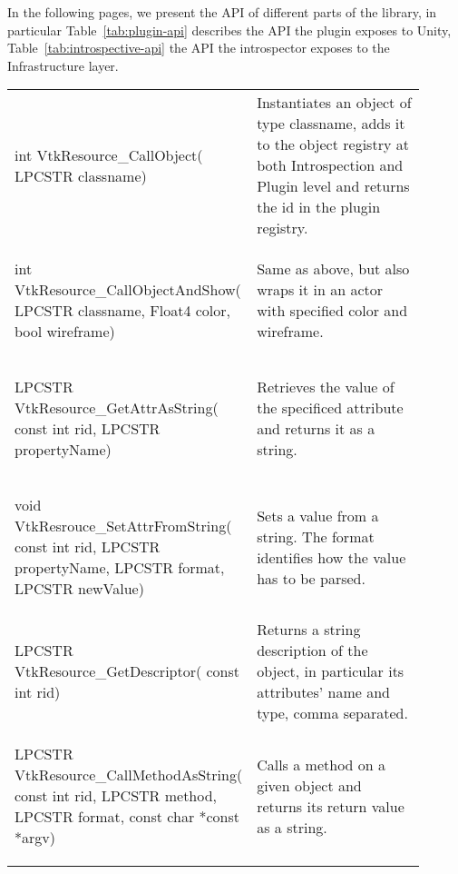 \begin{appendices}
In the following pages, we present the API of different parts of the library, in particular Table~\ref{tab:plugin-api} describes the API the plugin exposes to Unity, Table~\ref{tab:introspective-api} the API the introspector exposes to the Infrastructure layer.

\begin{landscape}
	\begin{longtable}[c]{
			>{\raggedright\arraybackslash}p{0.4\linewidth}
			>{\raggedright\arraybackslash}p{0.5\linewidth}
		}
		\multicolumn{1}{c}{\textbf{Function signature}} &
		\multicolumn{1}{c}{\textbf{Explenation}} 
		\\ \hline
	\endhead
	\begin{codify}
	int VtkResource_CallObject(
		LPCSTR classname)
	\end{codify} &
	Instantiates an object of type classname, adds it to the object registry at both Introspection and Plugin level and returns the id in the plugin registry.
	\\
	\begin{codify}
	int VtkResource_CallObjectAndShow(
		LPCSTR classname,
		Float4 color,
		bool wireframe)
	\end{codify} &
	Same as above, but also wraps it in an actor with specified color and wireframe.
	\\
	\begin{codify}
	LPCSTR VtkResource_GetAttrAsString(
		const int rid,
		LPCSTR propertyName)
	\end{codify} &
	Retrieves the value of the specificed attribute and returns it as a string.
	\\
	\begin{codify}
	void VtkResrouce_SetAttrFromString(
		const int rid,
		LPCSTR propertyName,
		LPCSTR format,
		LPCSTR newValue)
	\end{codify} &
	Sets a value from a string. The format identifies how the value has to be parsed.
	\\
	\begin{codify}
	LPCSTR VtkResource_GetDescriptor(
		const int rid)
	\end{codify} &
	Returns a string description of the object, in particular its attributes' name and type, comma separated.
	\\
	\begin{codify}
	LPCSTR VtkResource_CallMethodAsString(
		const int rid,
		LPCSTR method,
		LPCSTR format,
		const char *const *argv)
	\end{codify} &
	Calls a method on a given object and returns its return value as a string.

\end{longtable}
\end{landscape}
\end{appendices}
